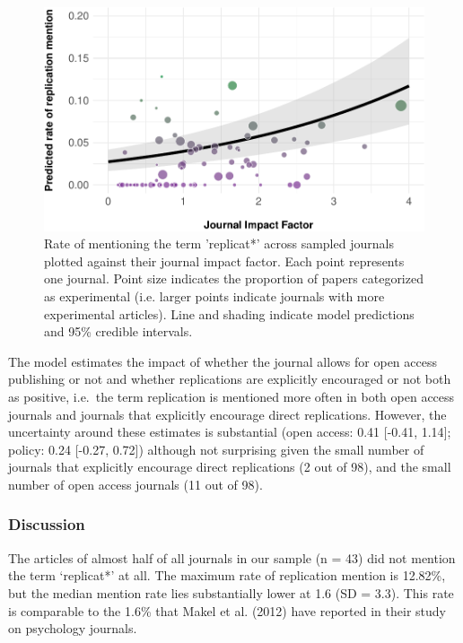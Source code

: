 \documentclass[]{elsarticle} %
\begin{document}
\begin{figure}

{\centering \includegraphics[width=1\linewidth]{ReplicationLing_files/figure-latex/plot_mention_jif-1} 

}

\caption{Rate of mentioning the term 'replicat*' across sampled journals plotted against their journal impact factor. Each point represents one journal. Point size indicates the proportion of papers categorized as experimental (i.e. larger points indicate journals with more experimental articles). Line and shading indicate model predictions and 95\% credible intervals.}\label{fig:plot_mention_jif}
\end{figure}

The model estimates the impact of whether the journal allows for open
access publishing or not and whether replications are explicitly
encouraged or not both as positive, i.e.~the term replication is
mentioned more often in both open access journals and journals that
explicitly encourage direct replications. However, the uncertainty
around these estimates is substantial (open access: 0.41 {[}-0.41,
1.14{]}; policy: 0.24 {[}-0.27, 0.72{]}) although not surprising given
the small number of journals that explicitly encourage direct
replications (2 out of 98), and the small number of open access journals
(11 out of 98).

\hypertarget{discussion}{%
\subsubsection{Discussion}\label{discussion}}

The articles of almost half of all journals in our sample (n = 43) did
not mention the term `replicat*' at all. The maximum rate of replication
mention is 12.82\%, but the median mention rate lies substantially lower
at 1.6 (SD = 3.3). This rate is comparable to the 1.6\% that Makel et
al. (2012) have reported in their study on psychology journals.
\end{document}
